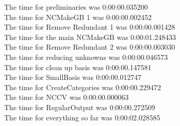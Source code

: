 \documentclass[rep10,leqno]{report}
\begin{document}
\noindent
The time for preliminaries was 0:00:00.035200\\
The time for NCMakeGB 1 was 0:00:00.002452\\
The time for Remove Redundant 1 was 0:00:00.001428\\
The time for the main NCMakeGB was 0:00:01.248433\\
The time for Remove Redundant 2 was 0:00:00.003030\\
The time for reducing unknowns was 0:00:00.046573\\
The time for clean up basis was 0:00:00.147581\\
The time for SmallBasis was 0:00:00.012747\\
The time for CreateCategories was 0:00:00.229472\\
The time for NCCV was 0:00:00.000063\\
The time for RegularOutput was 0:00:00.272509\\
The time for everything so far was 0:00:02.028585\\
\end{document}
